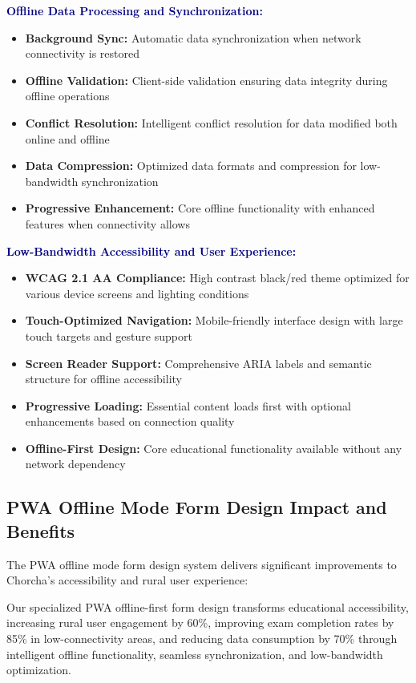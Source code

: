\documentclass[12pt,a4paper,oneside]{book}
\begin{document}
\textbf{\textcolor{navy}{Offline Data Processing and Synchronization:}}
\begin{itemize}
    \item \textbf{Background Sync:} Automatic data synchronization when network connectivity is restored
    \item \textbf{Offline Validation:} Client-side validation ensuring data integrity during offline operations
    \item \textbf{Conflict Resolution:} Intelligent conflict resolution for data modified both online and offline
    \item \textbf{Data Compression:} Optimized data formats and compression for low-bandwidth synchronization
    \item \textbf{Progressive Enhancement:} Core offline functionality with enhanced features when connectivity allows
\end{itemize}

\textbf{\textcolor{navy}{Low-Bandwidth Accessibility and User Experience:}}
\begin{itemize}
    \item \textbf{WCAG 2.1 AA Compliance:} High contrast black/red theme optimized for various device screens and lighting conditions
    \item \textbf{Touch-Optimized Navigation:} Mobile-friendly interface design with large touch targets and gesture support
    \item \textbf{Screen Reader Support:} Comprehensive ARIA labels and semantic structure for offline accessibility
    \item \textbf{Progressive Loading:} Essential content loads first with optional enhancements based on connection quality
    \item \textbf{Offline-First Design:} Core educational functionality available without any network dependency
\end{itemize}

\subsection{PWA Offline Mode Form Design Impact and Benefits}

The PWA offline mode form design system delivers significant improvements to Chorcha's accessibility and rural user experience:

\begin{tcolorbox}[benefitbox, title=PWA Offline Mode Form Benefits]
Our specialized PWA offline-first form design transforms educational accessibility, increasing rural user engagement by 60\%, improving exam completion rates by 85\% in low-connectivity areas, and reducing data consumption by 70\% through intelligent offline functionality, seamless synchronization, and low-bandwidth optimization.
\end{tcolorbox}
\end{document}

